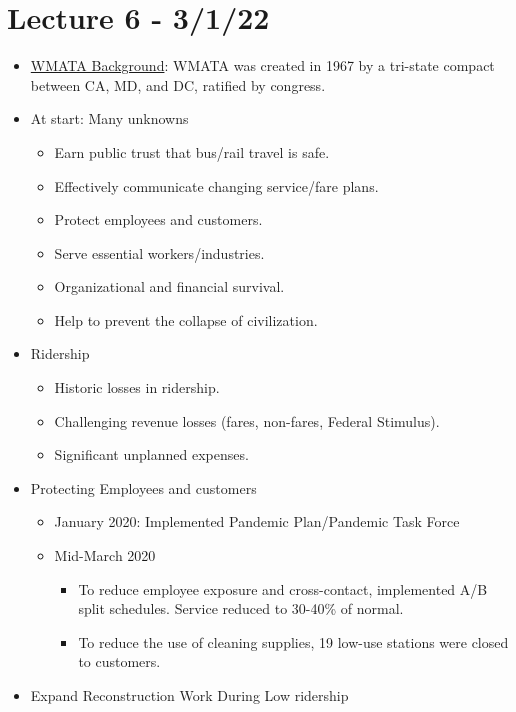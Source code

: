 \documentclass{article}
\begin{document}
\section*{Lecture 6 - 3/1/22}
\begin{itemize}
    \item \underline{WMATA Background}: WMATA was created in 1967 by a tri-state compact between CA, MD, and DC, ratified by congress.
    \item At start: Many unknowns
    \begin{itemize}
        \item Earn public trust that bus/rail travel is safe.
        \item Effectively communicate changing service/fare plans.
        \item Protect employees and customers.
        \item Serve essential workers/industries.
        \item Organizational and financial survival.
        \item Help to prevent the collapse of civilization.
    \end{itemize}
    \item Ridership
    \begin{itemize}
        \item Historic losses in ridership.
        \item Challenging revenue losses (fares, non-fares, Federal Stimulus).
        \item Significant unplanned expenses.
    \end{itemize}
    \item Protecting Employees and customers
    \begin{itemize}
        \item January 2020: Implemented Pandemic Plan/Pandemic Task Force
        \item Mid-March 2020
        \begin{itemize}
            \item To reduce employee exposure and cross-contact, implemented A/B split schedules. Service reduced to 30-40\% of normal.
            \item To reduce the use of cleaning supplies, 19 low-use stations were closed to customers.
        \end{itemize}
    \end{itemize}
    \item Expand Reconstruction Work During Low ridership
    \begin{itemize}

\end{itemize}
\end{itemize}
\end{document}
